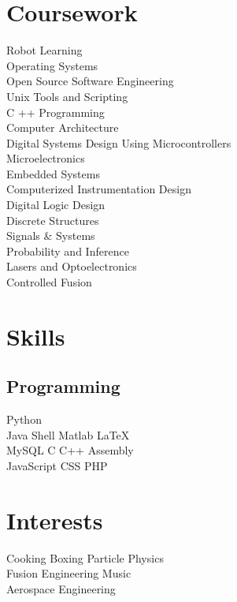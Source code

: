 \documentclass[]{deedy-resume-openfont}
\begin{document}
\begin{minipage}[t]{0.33\textwidth}
    \section{Coursework}
        Robot Learning\\
        Operating Systems \\
        Open Source Software Engineering \\
        Unix Tools and Scripting \\
        C ++ Programming\\
        Computer Architecture\\
        Digital Systems Design Using Microcontrollers\\
        Microelectronics\\
        Embedded Systems\\
        Computerized Instrumentation Design\\
        Digital Logic Design\\
        Discrete Structures\\
        Signals \& Systems\\
        Probability and Inference\\
        Lasers and Optoelectronics\\
        Controlled Fusion\\
    \sectionsep

    \section{Skills}
        \subsection{Programming}
            Python \\
            Java \textbullet{}
            Shell \textbullet{}
            Matlab \textbullet{}
            \LaTeX\ \\
            MySQL \textbullet{}
            C \textbullet{}
            C++ \textbullet{}
            Assembly \\
            JavaScript \textbullet{}
            CSS \textbullet{}
            PHP \\
    \sectionsep

    \section{Interests}
        Cooking \textbullet{}
        Boxing \textbullet{}
        Particle Physics \\
        Fusion Engineering \textbullet{}
        Music \\
        Aerospace Engineering
    \sectionsep

\end{minipage}
\end{document}
